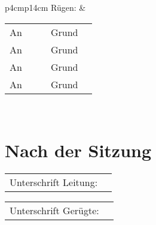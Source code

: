 \documentclass{sasbase}
\begin{document}
\vspace{3mm}
\begin{tabular}{p{4cm}p{14cm}}
    R\"{u}gen: &
    \begin{tabular}[t]{p{0.5cm}p{5cm}p{0.2cm}p{1cm}p{5.3cm}}
        An & \dotfill & & Grund & \dotfill \\[2mm]
        An & \dotfill & & Grund & \dotfill \\[2mm]
        An & \dotfill & & Grund & \dotfill \\[2mm]
        An & \dotfill & & Grund & \dotfill \\[2mm]
    \end{tabular}
    \\
\end{tabular}

\section{Nach der Sitzung}

\begin{tabular}{p{4cm}p{14cm}}
    Unterschrift Leitung: & \dotfill \\
\end{tabular}
\vspace*{1mm}

\begin{tabular}{p{4cm}p{14cm}}
    Unterschrift Ger\"{u}gte: & \dotfill \\
\end{tabular}
\end{document}
